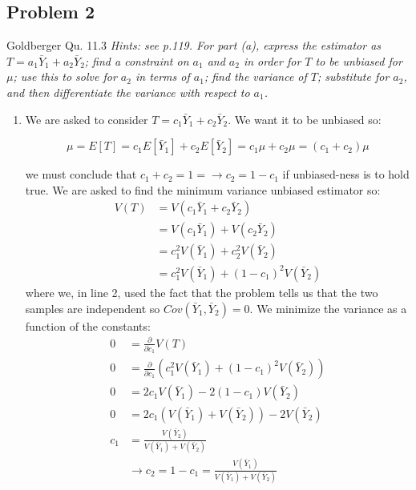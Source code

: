 \documentclass{article}
\newcommand{\1}{\mathbf{1}}
\begin{document}
\newpage
\subsection*{Problem 2}
Goldberger Qu. 11.3
 {\it Hints: see p.119. For part (a), express the estimator as $T=a_1{\bar{Y}_1} +a_2{\bar{Y}_2}$; find a constraint on $a_1$ and $a_2$ in order for $T$ to be unbiased for $\mu$; use this to solve for $a_2$ in terms of $a_1$; find the variance of $T$; substitute for $a_2$, and then differentiate the variance with respect to $a_1$.}
 \begin{enumerate}
     \item We are asked to consider $T=c_1\bar Y_1 + c_2 \bar Y_2$. We want it to be unbiased so:
     
     $$ \mu = E[T] = c_1 E[\bar Y_1] + c_2 E[\bar Y_2] = c_1\mu + c_2\mu = (c_1 + c_2)\mu  $$
     
     we must conclude that $c_1 + c_2 = 1 = \rightarrow c_2 = 1-c_1$ if unbiased-ness is to hold true. We are asked to find the minimum variance unbiased estimator so:
     \begin{align*}
         V(T) &= V(c_1\bar Y_1 + c_2 \bar Y_2) \\
         &= V(c_1\bar Y_1) + V(c_2 \bar Y_2) \\
         &= c_1^2 V(\bar Y_1) + c_2^2 V(\bar Y_2) \\
         &=  c_1^2 V(\bar Y_1) + (1-c_1)^2 V(\bar Y_2) 
     \end{align*}
     where we, in line 2, used the fact that the problem tells us that the two samples are independent so $Cov(\bar Y_1, \bar Y_2)=0$. We minimize the variance as a function of the constants:
    \begin{align*}
        0 &= \frac{\partial}{\partial c_1} V(T)  \\
        0 &= \frac{\partial}{\partial c_1} \left( c_1^2 V(\bar Y_1) + (1-c_1)^2 V(\bar Y_2)  \right) \\
        0 &= 2c_1 V(\bar Y_1) - 2(1-c_1)V(\bar Y_2) \\
        0 &= 2c_1( V(\bar Y_1) + V(\bar Y_2) ) - 2V(\bar Y_2) \\
        c_1 &= \frac{V(\bar Y_2)}{V(\bar Y_1) + V(\bar Y_2)} \\
        &\rightarrow c_2 = 1 - c_1 = \frac{V(\bar Y_1)}{V(\bar Y_1) + V(\bar Y_2)}
    \end{align*}
    

\end{enumerate}
\end{document}
